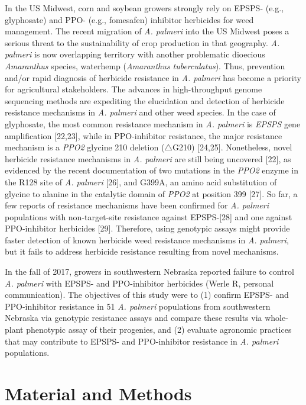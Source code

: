 \documentclass[10pt,letterpaper]{article}
\begin{document}
In the US Midwest, corn and soybean growers strongly rely on EPSPS-
(e.g., glyphosate) and PPO- (e.g., fomesafen) inhibitor herbicides for
weed management. The recent migration of \emph{A. palmeri} into the US
Midwest poses a serious threat to the sustainability of crop production
in that geography. \emph{A. palmeri} is now overlapping territory with
another problematic dioecious \emph{Amaranthus} species, waterhemp
(\emph{Amaranthus tuberculatus}). Thus, prevention and/or rapid
diagnosis of herbicide resistance in \emph{A. palmeri} has become a
priority for agricultural stakeholders. The advances in high-throughput
genome sequencing methods are expediting the elucidation and detection
of herbicide resistance mechanisms in \emph{A. palmeri} and other weed
species. In the case of glyphosate, the most common resistance mechanism
in \emph{A. palmeri} is \emph{EPSPS} gene amplification {[}22,23{]},
while in PPO-inhibitor resistance, the major resistance mechanism is a
\emph{PPO2} glycine 210 deletion (\(\triangle\)G210) {[}24,25{]}.
Nonetheless, novel herbicide resistance mechanisms in \emph{A. palmeri}
are still being uncovered {[}22{]}, as evidenced by the recent
documentation of two mutations in the \emph{PPO2} enzyme in the R128
site of \emph{A. palmeri} {[}26{]}, and G399A, an amino acid
substitution of glycine to alanine in the catalytic domain of
\emph{PPO2} at position 399 {[}27{]}. So far, a few reports of
resistance mechanisms have been confirmed for \emph{A. palmeri}
populations with non-target-site resistance against EPSPS-{[}28{]} and
one against PPO-inhibitor herbicides {[}29{]}. Therefore, using
genotypic assays might provide faster detection of known herbicide weed
resistance mechanisms in \emph{A. palmeri}, but it fails to address
herbicide resistance resulting from novel mechanisms.

In the fall of 2017, growers in southwestern Nebraska reported failure
to control \emph{A. palmeri} with EPSPS- and PPO-inhibitor herbicides
(Werle R, personal communication). The objectives of this study were to
(1) confirm EPSPS- and PPO-inhibitor resistance in 51 \emph{A. palmeri}
populations from southwestern Nebraska via genotypic resistance assays
and compare these results via whole-plant phenotypic assay of their
progenies, and (2) evaluate agronomic practices that may contribute to
EPSPS- and PPO-inhibitor resistance in \emph{A. palmeri} populations.

\hypertarget{material-and-methods}{%
\section{Material and Methods}\label{material-and-methods}}
\end{document}
